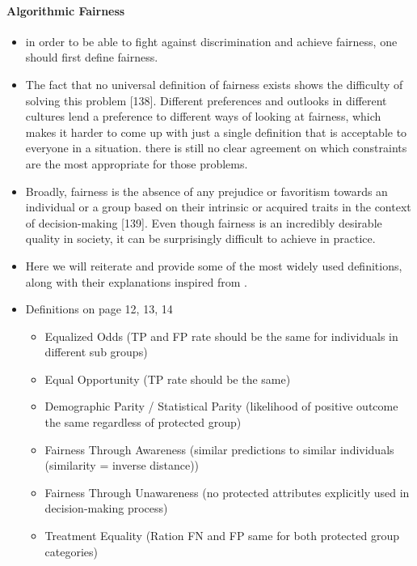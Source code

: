 \documentclass[12pt, a4paper, oneside]{book}   	%
\begin{document}
			\paragraph{Algorithmic Fairness}
			\begin{itemize}
				\item in order to be able to fight against discrimination and achieve fairness, one should first define fairness. \autocite{Mehrabi_2021}
				\item The fact that no universal definition of fairness exists shows the difficulty of solving this problem [138]. Different preferences and outlooks in different cultures lend a preference to different ways of looking at fairness, which makes it harder to come up with just a single definition that is acceptable to everyone in a situation. there is still no clear agreement on which constraints are the most appropriate for those problems. \autocite{Mehrabi_2021}
				\item Broadly, fairness is the absence of any prejudice or favoritism towards an individual or a group based on their intrinsic or acquired traits in the context of decision-making [139]. Even though fairness is an incredibly desirable quality in society, it can be surprisingly difficult to achieve in practice. \autocite{Mehrabi_2021}
				\item Here we will reiterate and provide some of the most widely used definitions, along with their explanations inspired from \autocite{M149_Verma_2018}.\autocite{Mehrabi_2021}
				\item Definitions on page 12, 13, 14 \autocite{Mehrabi_2021}
				\begin{itemize}
					\item Equalized Odds (TP and FP rate should be the same for individuals in different sub groups) \autocite{Mehrabi_2021}
					\item Equal Opportunity (TP rate should be the same) \autocite{Mehrabi_2021}
					\item Demographic Parity / Statistical Parity (likelihood of positive outcome the same regardless of protected group) \autocite{Mehrabi_2021}
					\item Fairness Through Awareness (similar predictions to similar individuals (similarity = inverse distance)) \autocite{Mehrabi_2021}
					\item Fairness Through Unawareness (no protected attributes explicitly used in decision-making process) \autocite{Mehrabi_2021}
					\item Treatment Equality (Ration FN and FP same for both protected group categories) \autocite{Mehrabi_2021}

\end{itemize}
\end{itemize}
\end{document}
